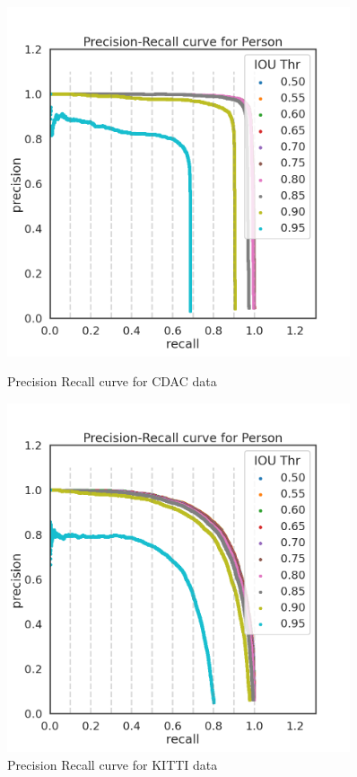 \documentclass[12pt,letterpaper]{article}
\begin{document}
\begin{figure}[H]
    \centering

    \begin{minipage}{0.45\textwidth}
        \centering
        \includegraphics[width=0.9\textwidth]{assets/YOLO_MAP_CDAC.png}
        \caption{Precision Recall curve for CDAC data}
    \end{minipage} \hfill
    \begin{minipage}{0.45\textwidth}
        \centering
        \includegraphics[width=0.9\textwidth]{assets/YOLO_MAP_KITTI.png}
        \caption{Precision Recall curve for KITTI data}
    \end{minipage}

\end{figure}
\end{document}
